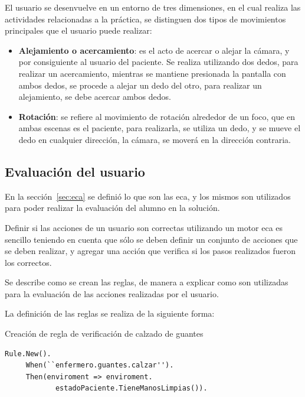 El usuario se desenvuelve en un entorno de tres dimensiones, en el cual realiza las
actividades relacionadas a la práctica, se distinguen dos tipos de movimientos
principales que el usuario puede realizar:

\begin{itemize}
    \item \textbf{Alejamiento o acercamiento}: es el acto de acercar o alejar la
        cámara, y por consiguiente al usuario del paciente. Se realiza
        utilizando dos dedos, para realizar un acercamiento, mientras se
        mantiene presionada la pantalla con ambos dedos, se procede a alejar un
        dedo del otro, para realizar un alejamiento, se debe acercar ambos
        dedos.
    \item \textbf{Rotación}: se refiere al movimiento de rotación alrededor de
        un foco, que en ambas escenas es el paciente, para realizarla, se utiliza
        un dedo, y se mueve el dedo en cualquier dirección, la cámara, se moverá
        en la dirección contraria.
\end{itemize}

\subsection{Evaluación del usuario}
\label{sec:eca_impl}


En la sección~\ref{sec:eca} se definió lo que son las \Gls{eca}, y los mismos
son utilizados para poder realizar la evaluación del
alumno en la solución.

Definir si las acciones de un usuario son correctas utilizando un motor
\Gls{eca} es sencillo teniendo en cuenta que sólo se deben definir un
conjunto de acciones que se deben realizar, y agregar una acción que verifica si
los pasos realizados fueron los correctos.

Se describe como se crean las reglas, de manera a explicar como son utilizadas
para la evaluación de las acciones realizadas por el usuario.

La definición de las reglas se realiza de la siguiente forma:

\begin{algorithm}[H]
\caption{Creación de regla de verificación de calzado de guantes}
\label{alg:rule_guante}
\lstset{style=sharpc}
\begin{lstlisting}
Rule.New().
     When(``enfermero.guantes.calzar'').
     Then(enviroment => enviroment.
            estadoPaciente.TieneManosLimpias()).
\end{lstlisting}
\end{algorithm}

